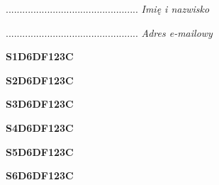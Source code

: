 \begin{turn}{90}\begin{minipage}{\linewidth} \vspace{20mm} ................................................  \textit{Imię i nazwisko}\end{minipage}\end{turn}

\begin{turn}{90}\begin{minipage}{\linewidth} \vspace{20mm} ................................................  \textit{Adres e-mailowy}\end{minipage}\end{turn}

\begin{turn}{90}\huge \begin{minipage}{\linewidth} \vspace{10mm}\textbf{S1D6DF123C}\end{minipage}\end{turn}

\begin{turn}{90}\huge \begin{minipage}{\linewidth} \vspace{10mm}\textbf{S2D6DF123C}\end{minipage}\end{turn}

\begin{turn}{90}\huge \begin{minipage}{\linewidth} \vspace{10mm}\textbf{S3D6DF123C}\end{minipage}\end{turn}

\begin{turn}{90}\huge \begin{minipage}{\linewidth} \vspace{10mm}\textbf{S4D6DF123C}\end{minipage}\end{turn}

\begin{turn}{90}\huge \begin{minipage}{\linewidth} \vspace{10mm}\textbf{S5D6DF123C}\end{minipage}\end{turn}

\begin{turn}{90}\huge \begin{minipage}{\linewidth} \vspace{10mm}\textbf{S6D6DF123C}\end{minipage}\end{turn}


